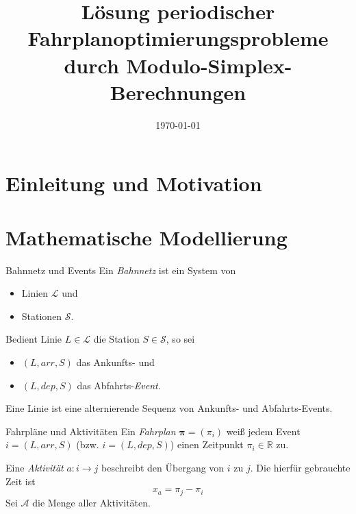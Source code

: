 \documentclass[accentcolor = tud11b, colorbacktitle, landscape, german, presentation]{tudbeamer}
\title{Lösung periodischer Fahrplanoptimierungsprobleme durch Modulo-Simplex-Berechnungen}
\institute{Fabian Damken}
\date{\today}
\newcommand{\arr}{\mathit{arr}}
\newcommand{\dep}{\mathit{dep}}
\newcommand{\R}{\ensuremath{\mathbb{R}}}
\renewcommand{\vec}[1]{\boldsymbol{\mathbf{#1}}}
\begin{document}
	
	
	\begin{titleframe}
	\end{titleframe}

	\section{Einleitung und Motivation}
	
	\section{Mathematische Modellierung}
		\begin{frame}{Bahnnetz und Events}
			Ein \emph{Bahnnetz} ist ein System von
			\begin{itemize}
				\item Linien    \tabto{1.5cm} \(\mathcal{L}\) und
				\item Stationen \tabto{1.5cm} \(\mathcal{S}\).
			\end{itemize}
		
			\vspace{1cm}
			Bedient Linie \( L \in \mathcal{L} \) die Station \( S \in \mathcal{S} \), so sei
			\begin{itemize}
				\item \( (L, \arr, S) \) \tabto{1.6cm} das Ankunfts- und
				\item \( (L, \dep, S) \) \tabto{1.6cm} das Abfahrts-\emph{Event}.
			\end{itemize}
		
			Eine Linie ist eine alternierende Sequenz von Ankunfts- und Abfahrts-Events.
		\end{frame}
	
		\begin{frame}{Fahrpläne und Aktivitäten}
			Ein \emph{Fahrplan} \( \vec{\pi} = (\pi_i) \) weiß jedem Event \( i = (L, \arr, S) \) (bzw. \( i = (L, \dep, S) \)) einen Zeitpunkt \( \pi_i \in \R \) zu.
			
			\vspace{1cm}
			Eine \emph{Aktivität} \( a : i \to j \) beschreibt den Übergang von \(i\) zu \(j\). Die hierfür gebrauchte Zeit ist
			\begin{equation*}
				x_a = \pi_j - \pi_i
			\end{equation*}
			Sei \( \mathcal{A} \) die Menge aller Aktivitäten.
		\end{frame}
	
\end{document}
